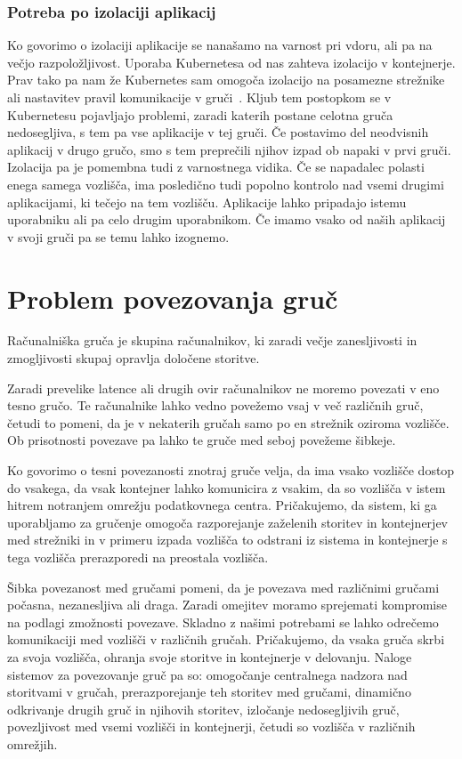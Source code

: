 \documentclass[a4paper, 12pt]{book}
\begin{document}
\subsection{Potreba po izolaciji aplikacij}
Ko govorimo o izolaciji aplikacije se nanašamo na varnost pri vdoru, ali pa na večjo razpoložljivost.
Uporaba Kubernetesa od nas zahteva izolacijo v kontejnerje.
Prav tako pa nam že Kubernetes sam omogoča izolacijo na posamezne strežnike~\cite{kube-network-policy} ali nastavitev pravil komunikacije v gruči~\cite{kube-pod-to-node}.
Kljub tem postopkom se v Kubernetesu pojavljajo problemi, zaradi katerih postane celotna gruča nedosegljiva, s tem pa vse aplikacije v tej gruči.
Če postavimo del neodvisnih aplikacij v drugo gručo, smo s tem preprečili njihov izpad ob napaki v prvi gruči.
Izolacija pa je pomembna tudi z varnostnega vidika.
Če se napadalec polasti enega samega vozlišča, ima posledično tudi popolno kontrolo nad vsemi drugimi aplikacijami, ki tečejo na tem vozlišču.
Aplikacije lahko pripadajo istemu uporabniku ali pa celo drugim uporabnikom.
Če imamo vsako od naših aplikacij v svoji gruči pa se temu lahko izognemo.
\chapter{Problem povezovanja gruč}
Računalniška gruča je skupina računalnikov, ki zaradi večje zanesljivosti in zmogljivosti skupaj opravlja določene storitve.

Zaradi prevelike latence ali drugih ovir računalnikov ne moremo povezati v eno tesno gručo.
Te računalnike lahko vedno povežemo vsaj v več različnih gruč, četudi to pomeni, da je v nekaterih gručah samo po en strežnik oziroma vozlišče.
Ob prisotnosti povezave pa lahko te gruče med seboj povežeme šibkeje.

Ko govorimo o tesni povezanosti znotraj gruče velja, da ima vsako vozlišče dostop do vsakega, da vsak kontejner lahko komunicira z vsakim, da so vozlišča v istem hitrem notranjem omrežju podatkovnega centra. 
Pričakujemo, da sistem, ki ga uporabljamo za gručenje omogoča razporejanje zaželenih storitev in kontejnerjev med strežniki in v primeru izpada vozlišča to odstrani iz sistema in kontejnerje s tega vozlišča prerazporedi na preostala vozlišča.

Šibka povezanost med gručami pomeni, da je povezava med različnimi gručami počasna, nezanesljiva ali draga.
Zaradi omejitev moramo sprejemati kompromise na podlagi zmožnosti povezave.
Skladno z našimi potrebami se lahko odrečemo komunikaciji med vozlišči v različnih gručah.
Pričakujemo, da vsaka gruča skrbi za svoja vozlišča, ohranja svoje storitve in kontejnerje v delovanju.
Naloge sistemov za povezovanje gruč pa so: omogočanje centralnega nadzora nad storitvami v gručah, prerazporejanje teh storitev med gručami, dinamično odkrivanje drugih gruč in njihovih storitev, izločanje nedosegljivih gruč, povezljivost med vsemi vozlišči in kontejnerji, četudi so vozlišča v različnih omrežjih.
\end{document}
